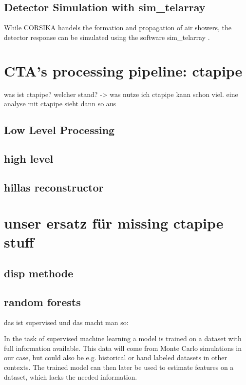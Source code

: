 \subsection{Detector Simulation with sim\_telarray}
While CORSIKA handels the formation and propagation of air showers,
the detector response can be simulated using the software
sim\_telarray \cite{BERNLOHR2008149}.



\section{CTA's processing pipeline: ctapipe}
was ist ctapipe?
welcher stand? -> was nutze ich
ctapipe kann schon viel.
eine analyse mit ctapipe sieht dann so aus
\subsection{Low Level Processing}

\subsection{high level}
\subsection{hillas reconstructor}

\section{unser ersatz für missing ctapipe stuff}
\subsection{disp methode}
\subsection{random forests}
das ist supervised und das macht man so:

In the task of supervised machine learning a model is trained on a
dataset with full information available.
This data will come from Monte Carlo simulations in our case, but
could also be e.g. historical or hand labeled datasets in other contexts.
The trained model can then later be used to estimate features on a dataset, which
lacks the needed information.

